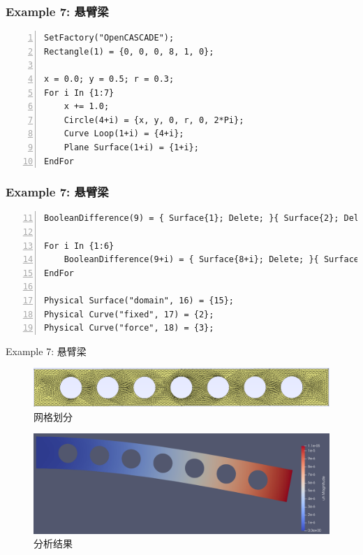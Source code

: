 \documentclass[lang=en,aspectratio=43,theme=default,logo=on]{simplebeamer}
\begin{document}
\begin{frame}[fragile]
    \frametitle{Example 7: 悬臂梁}
 \begin{lstlisting}[caption={Gmsh生成网格}, firstnumber=1, numbers=left, xleftmargin=0.0\linewidth]
SetFactory("OpenCASCADE");
Rectangle(1) = {0, 0, 0, 8, 1, 0};

x = 0.0; y = 0.5; r = 0.3;
For i In {1:7}
    x += 1.0;
    Circle(4+i) = {x, y, 0, r, 0, 2*Pi};
    Curve Loop(1+i) = {4+i};
    Plane Surface(1+i) = {1+i};
EndFor
\end{lstlisting}
\end{frame}

\begin{frame}[fragile]
    \frametitle{Example 7: 悬臂梁}
\begin{lstlisting}[caption={Gmsh生成网格（续）}, firstnumber=11, numbers=left, xleftmargin=0.0\linewidth]
BooleanDifference(9) = { Surface{1}; Delete; }{ Surface{2}; Delete; };

For i In {1:6}
    BooleanDifference(9+i) = { Surface{8+i}; Delete; }{ Surface{2+i}; Delete; };
EndFor

Physical Surface("domain", 16) = {15};
Physical Curve("fixed", 17) = {2};
Physical Curve("force", 18) = {3};
\end{lstlisting}
\end{frame}

\begin{frame}{Example 7: 悬臂梁}
    \begin{figure}
        \centering
        \includegraphics[width=1.0\textwidth]{./img/023.png}
        \caption{网格划分}
    \end{figure}
    \begin{figure}
        \centering
        \includegraphics[width=1.0\textwidth]{./img/022.png}
        \caption{分析结果}
    \end{figure}
\end{frame}
\end{document}
